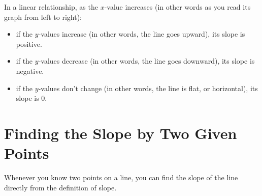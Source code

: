 \documentclass[nooutcomes]{ximera}
\begin{document}
In a linear relationship, as the $x$-value increases (in other words as you read its graph from left to right):
\begin{itemize}
\item if the $y$-values increase (in other words, the line goes upward), its slope is positive. \\
\begin{image}
\end{image}
\item if the $y$-values decrease (in other words, the line goes downward), its slope is negative. \\
\begin{image}
\end{image}
\item if the $y$-values don't change (in other words, the line is flat, or horizontal), its slope is 0. \\
\begin{image}
\end{image}
\end{itemize}


\section{Finding the Slope by Two Given Points}
Whenever you know two points on a line, you can find the slope of the line directly from the definition of slope.
\end{document}
